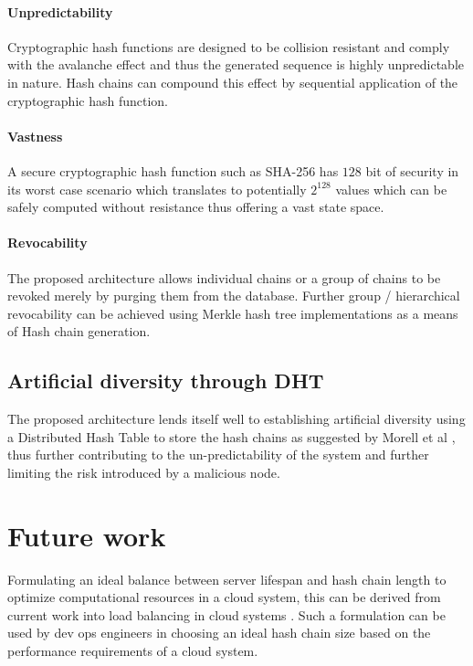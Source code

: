 \documentclass{sig-alternate-05-2015}
\begin{document}
\paragraph*{Unpredictability} Cryptographic hash functions \cite{rogaway_cryptographic_2004} are designed to be collision resistant and comply with the avalanche effect and thus the generated sequence is highly unpredictable in nature. Hash chains can compound this effect by sequential application of the cryptographic hash function.

\paragraph*{Vastness} A secure cryptographic hash function such as SHA-256 has $128$ bit of security in its worst case scenario which translates to potentially $2^{128}$ values which can be safely computed without resistance thus offering a vast state space.

\paragraph*{Revocability} The proposed architecture allows individual chains or a group of chains to be revoked merely by purging them from the database. Further group / hierarchical revocability can be achieved using Merkle hash tree implementations as a means of Hash chain generation.

\subsection{Artificial diversity through DHT}

The proposed architecture lends itself well to establishing artificial diversity using a Distributed Hash Table to store the hash chains as suggested by Morell et al \cite{morrell_dht_2015}, thus further contributing to the un-predictability of the system and further limiting the risk introduced by a malicious node.

\section{Future work}

Formulating an ideal balance between server lifespan and hash chain length to optimize computational resources in a cloud system, this can be derived from current work into load balancing in cloud systems \cite{randles_comparative_2010}. Such a formulation can be used by dev ops engineers in choosing an ideal hash chain size based on the performance requirements of a cloud system.
\end{document}
